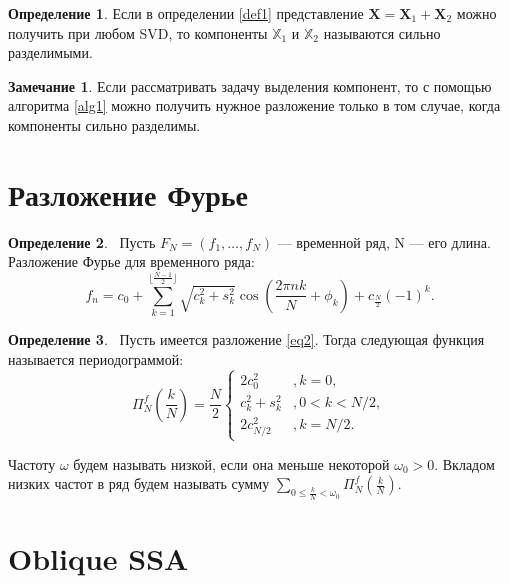 \documentclass[specialist, substylefile = spbureport.rtx, subf,href,colorlinks=true, 12pt]{disser}
\theoremstyle{definition}
\newtheorem{definition}{Определение}
\newtheorem{remark}{Замечание}
\begin{document}
\begin{definition}
    Если в определении \ref{def1} представление $\mathbf{X} = \mathbf{X}_1 + \mathbf{X}_2$ можно получить при любом SVD, то компоненты $\mathbb{X}_1$ и $\mathbb{X}_2$ называются сильно разделимыми.
\end{definition}

\begin{remark}
    Если рассматривать задачу выделения компонент, то с помощью алгоритма \ref{alg1} можно получить нужное разложение только в том случае, когда компоненты сильно разделимы.
\end{remark}

\section{Разложение Фурье}
\begin{definition}
    ~Пусть $F_N=(f_1, \ldots, f_N)$ --- временной ряд, N --- его длина. Разложение Фурье для временного ряда:
    \begin{equation*} \label{eq2} \tag{1}
        f_n = c_0 + \sum\limits_{k = 1}^{\lfloor \frac{N - 1}{2}\rfloor} \sqrt{c_k^2 + s_k^2}\cos (\frac{2\pi nk}{N} + \phi_k) + c_{\frac{N}{2}}(-1)^k.
    \end{equation*}
\end{definition}
\begin{definition}
    ~Пусть имеется разложение \eqref{eq2}. Тогда следующая функция называется периодограммой:
    \begin{equation*}
                \Pi^f_N (\frac{k}{N}) = \frac{N}{2}
        \begin{cases}
        2c_0^2 & ,k = 0,\\
        c_k^2+s_k^2 & ,0 < k < N/2,\\
        2c^2_{N/2} & ,k = N/2.
        \end{cases}
    \end{equation*}
\end{definition}
Частоту $\omega$ будем называть низкой, если она меньше некоторой $\omega_0 > 0$. Вкладом низких частот в ряд будем называть сумму $\sum\limits_{0 \leq \frac{k}{N} < \omega_0}\Pi_N^f(\frac{k}{N})$.

\section{Oblique SSA}
\end{document}

